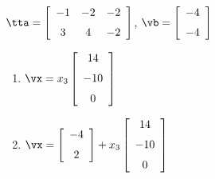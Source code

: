 {$\tta = \left[ \begin {array}{ccc} -1&-2&-2\\\noalign{\medskip}3&4&-2
\end {array} \right] $, $\vb=\left[ \begin {array}{c} -4\\\noalign{\medskip}-4\end {array}\right]$}
{\begin{enumerate}
\item	 $\vx=x_3\left[ \begin {array}{c} 14\\\noalign{\medskip}-10\\\noalign{\medskip}0\end {array} \right]$
\item	 $\vx=\left[ \begin {array}{c} -4\\\noalign{\medskip}2\end {array}
\right]+x_3\left[ \begin {array}{c} 14\\\noalign{\medskip}-10\\\noalign{\medskip}0\end {array} \right]$ 
\end{enumerate}
 }

 

 






